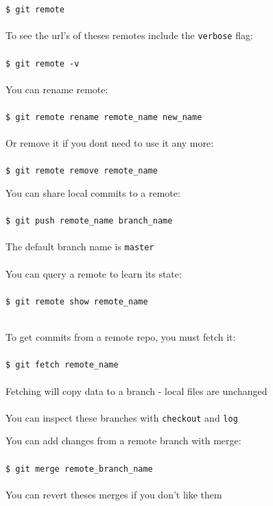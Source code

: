 \documentclass{beamer}
\begin{document}
\begin{frame}[allowframebreaks]{\secname}
    {\tt \$ git remote} \\~\\

    To see the url's of theses remotes include the {\tt verbose} flag: \\~\\

    {\tt \$ git remote -v} \\~\\

    You can rename remote:\\~\\
    {\tt \$ git remote rename remote\_name new\_name} \\~\\

    Or remove it if you dont need to use it any more: \\~\\

    {\tt \$ git remote remove remote\_name}

\framebreak

    You can share local commits to a remote: \\~\\

    {\tt \$ git push remote\_name branch\_name} \\~\\

    The default branch name is {\tt master} \\~\\

    You can query a remote to learn its state: \\~\\

    {\tt \$ git remote show remote\_name} \\~\\

\framebreak

    To get commits from a remote repo, you must fetch it:\\~\\

    {\tt \$ git fetch remote\_name} \\~\\

    Fetching will copy data to a branch - local files are unchanged \\~\\

    You can inspect these branches with {\tt checkout} and {\tt log}
    
\framebreak

    You can add changes from a remote branch with merge: \\~\\

    {\tt \$ git merge remote\_branch\_name} \\~\\

    You can revert theses merges if you don't like them
\end{frame}
\end{document}
